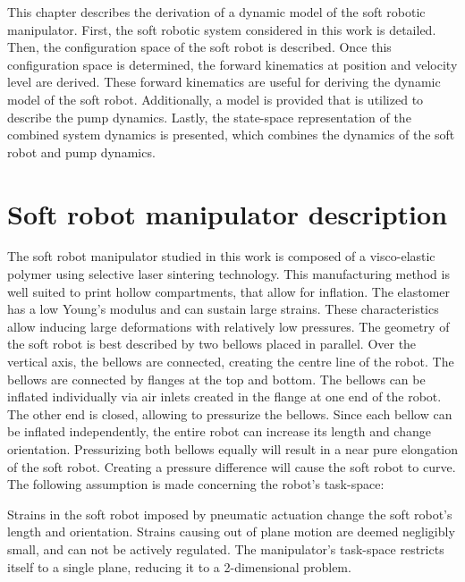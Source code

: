 \label{chap2}

This chapter describes the derivation of a dynamic model of the soft robotic manipulator. First, the soft robotic system considered in this work is detailed. Then, the configuration space of the soft robot is described. Once this configuration space is determined, the forward kinematics at position and velocity level are derived. These forward kinematics are useful for deriving the dynamic model of the soft robot. Additionally, a model is provided that is utilized to describe the pump dynamics. Lastly, the state-space representation of the combined system dynamics is presented, which combines the dynamics of the soft robot and pump dynamics.



\section{Soft robot manipulator description}

The soft robot manipulator studied in this work is composed of a visco-elastic polymer using selective laser sintering technology. This manufacturing method is well suited to print hollow compartments, that allow for inflation. The elastomer has a low Young's modulus and can sustain large strains. These characteristics allow inducing large deformations with relatively low pressures. The geometry of the soft robot is best described by two bellows placed in parallel. Over the vertical axis, the bellows are connected, creating the centre line of the robot. The bellows are connected by flanges at the top and bottom. The bellows can be inflated individually via air inlets created in the flange at one end of the robot. The other end is closed, allowing to pressurize the bellows. Since each bellow can be inflated independently, the entire robot can increase its length and change orientation. Pressurizing both bellows equally will result in a near pure elongation of the soft robot. Creating a pressure difference will cause the soft robot to curve. The following assumption is made concerning the robot's task-space:

\begin{theorem}
Strains in the soft robot imposed by pneumatic actuation change the soft robot's length and orientation. Strains causing out of plane motion are deemed negligibly small, and can not be actively regulated. The manipulator's task-space restricts itself to a single plane, reducing it to a 2-dimensional problem.
\end{theorem}

